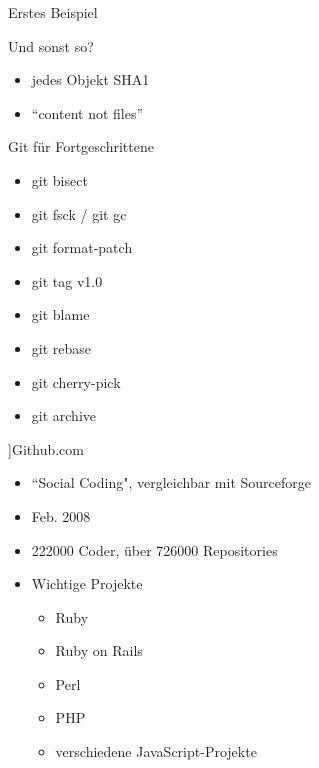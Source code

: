 \documentclass{beamer}
\begin{document}
\begin{frame}{Erstes Beispiel}

\end{frame}

\begin{frame}[<+->]{Und sonst so?}{}
  \begin{itemize}
    \item jedes Objekt SHA1
    \item ``content not files''
  \end{itemize}
\end{frame}

\begin{frame}[<+->]{Git für Fortgeschrittene}{}
  \begin{itemize}
    \item git bisect
    \item git fsck / git gc
    \item git format-patch
    \item git tag v1.0
    \item git blame
    \item git rebase
    \item git cherry-pick
    \item git archive
  \end{itemize}
\end{frame}

\begin{frame}[<+->]]{Github.com}
\begin{itemize}
    \item ``Social Coding", vergleichbar mit Sourceforge
	\item Feb. 2008
	\item 222000 Coder, über 726000 Repositories
	\item Wichtige Projekte
	\begin{itemize}
	  \item Ruby
	  \item Ruby on Rails
	  \item Perl
	  \item PHP
	  \item verschiedene JavaScript-Projekte
	\end{itemize}
  \end{itemize}
\end{frame}
\end{document}
